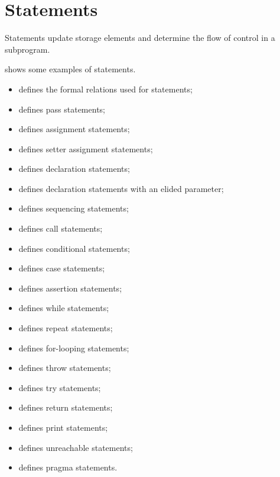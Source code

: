 \chapter{Statements\label{chap:Statements}}
Statements update storage elements and determine the flow of control in a subprogram.

 shows some examples of statements.

\ChapterOutline
\begin{itemize}
  \item {} defines the formal relations used for statements;
  \item {} defines pass statements;
  \item {} defines assignment statements;
  \item {} defines setter assignment statements;
  \item {} defines declaration statements;
  \item {} defines declaration statements with an elided parameter;
  \item {} defines sequencing statements;
  \item {} defines call statements;
  \item {} defines conditional statements;
  \item {} defines case statements;
  \item {} defines assertion statements;
  \item {} defines while statements;
  \item {} defines repeat statements;
  \item {} defines for-looping statements;
  \item {} defines throw statements;
  \item {} defines try statements;
  \item {} defines return statements;
  \item {} defines print statements;
  \item {} defines unreachable statements;
  \item {} defines pragma statements.
\end{itemize}

